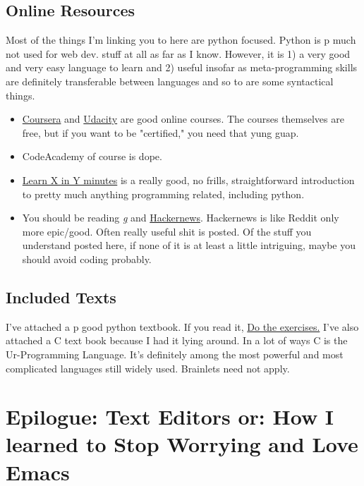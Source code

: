 \documentclass[11pt]{article}
\begin{document}
\subsection{Online Resources}
\label{sec:orgc6a6aae}

Most of the things I'm linking you to here are python focused. Python is p much not used for web dev. stuff at all as far as I know. However, it is 1) a very good and very easy language to learn and 2) useful insofar as meta-programming skills are definitely transferable between languages and so to are some syntactical things. 
\begin{itemize}
\item \href{https://www.coursera.org/specializations/python}{Coursera} and \href{https://www.udacity.com/course/programming-foundations-with-python--ud036}{Udacity} are good online courses. The courses themselves are free, but if you want to be "certified," you need that yung guap.
\item CodeAcademy of course is dope.
\item \href{https://learnxinyminutes.com/}{Learn X in Y minutes} is a really good, no frills, straightforward introduction to pretty much anything programming related, including python.
\item You should be reading \href{http://boards.4chan.org/g/}{\emph{g}} and \href{https://news.ycombinator.com/}{Hackernews}. Hackernews is like Reddit only more epic/good. Often really useful shit is posted. Of the stuff you understand posted here, if none of it is at least a little intriguing, maybe you should avoid coding probably.
\end{itemize}

\subsection{Included Texts}
\label{sec:org42aa748}

I've attached a p good python textbook. If you read it, \uline{Do the exercises.}
I've also attached a C text book because I had it lying around. In a lot of ways C is the Ur-Programming Language. It's definitely among the most powerful and most complicated languages still widely used. Brainlets need not apply.

\section{Epilogue: Text Editors or: How I learned to Stop Worrying and Love Emacs}
\label{sec:org19c15dc}
\end{document}
